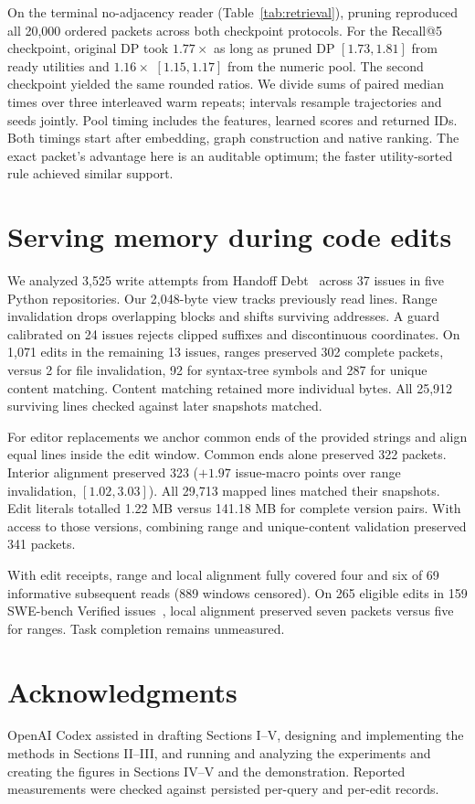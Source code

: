 \documentclass[conference]{IEEEtran}
\begin{document}
On the terminal no-adjacency reader (Table~\ref{tab:retrieval}), pruning reproduced all 20,000 ordered packets across both checkpoint protocols. For the Recall@5 checkpoint, original DP took $1.77\times$ as long as pruned DP $[1.73,1.81]$ from ready utilities and $1.16\times$ $[1.15,1.17]$ from the numeric pool. The second checkpoint yielded the same rounded ratios. We divide sums of paired median times over three interleaved warm repeats; intervals resample trajectories and seeds jointly. Pool timing includes the features, learned scores and returned IDs. Both timings start after embedding, graph construction and native ranking. The exact packet's advantage here is an auditable optimum; the faster utility-sorted rule achieved similar support.

\section{Serving memory during code edits}
We analyzed 3,525 write attempts from Handoff Debt~\cite{handoff} across 37 issues in five Python repositories. Our 2,048-byte view tracks previously read lines. Range invalidation drops overlapping blocks and shifts surviving addresses. A guard calibrated on 24 issues rejects clipped suffixes and discontinuous coordinates. On 1,071 edits in the remaining 13 issues, ranges preserved 302 complete packets, versus 2 for file invalidation, 92 for syntax-tree symbols and 287 for unique content matching. Content matching retained more individual bytes. All 25,912 surviving lines checked against later snapshots matched.

For editor replacements we anchor common ends of the provided strings and align equal lines inside the edit window. Common ends alone preserved 322 packets. Interior alignment preserved 323 ($+1.97$ issue-macro points over range invalidation, $[1.02,3.03]$). All 29,713 mapped lines matched their snapshots. Edit literals totalled 1.22 MB versus 141.18 MB for complete version pairs. With access to those versions, combining range and unique-content validation preserved 341 packets.

With edit receipts, range and local alignment fully covered four and six of 69 informative subsequent reads (889 windows censored). On 265 eligible edits in 159 SWE-bench Verified issues~\cite{swe-run}, local alignment preserved seven packets versus five for ranges. Task completion remains unmeasured.



\section*{Acknowledgments}
OpenAI Codex assisted in drafting Sections I--V, designing and implementing the methods in Sections II--III, and running and analyzing the experiments and creating the figures in Sections IV--V and the demonstration. Reported measurements were checked against persisted per-query and per-edit records.



\end{document}

